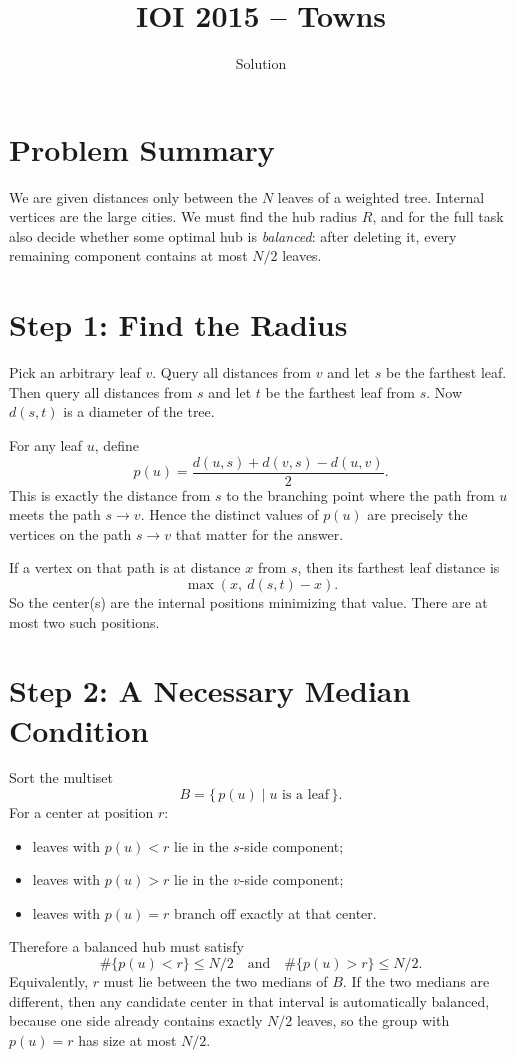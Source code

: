 \documentclass[11pt,a4paper]{article}
\title{IOI 2015 -- Towns}
\author{Solution}
\date{}
\begin{document}
\maketitle

\section{Problem Summary}
We are given distances only between the $N$ leaves of a weighted tree.
Internal vertices are the large cities.
We must find the hub radius $R$, and for the full task also decide whether some optimal hub is
\emph{balanced}: after deleting it, every remaining component contains at most $N/2$ leaves.

\section{Step 1: Find the Radius}
Pick an arbitrary leaf $v$.
Query all distances from $v$ and let $s$ be the farthest leaf.
Then query all distances from $s$ and let $t$ be the farthest leaf from $s$.
Now $d(s,t)$ is a diameter of the tree.

For any leaf $u$, define
\[
p(u) = \frac{d(u,s) + d(v,s) - d(u,v)}{2}.
\]
This is exactly the distance from $s$ to the branching point where the path from $u$ meets the
path $s \to v$.
Hence the distinct values of $p(u)$ are precisely the vertices on the path $s \to v$ that matter for
the answer.

If a vertex on that path is at distance $x$ from $s$, then its farthest leaf distance is
\[
\max(x,\ d(s,t)-x).
\]
So the center(s) are the internal positions minimizing that value.
There are at most two such positions.

\section{Step 2: A Necessary Median Condition}
Sort the multiset
\[
B = \{\,p(u)\mid u \text{ is a leaf}\,\}.
\]
For a center at position $r$:
\begin{itemize}
  \item leaves with $p(u) < r$ lie in the $s$-side component;
  \item leaves with $p(u) > r$ lie in the $v$-side component;
  \item leaves with $p(u) = r$ branch off exactly at that center.
\end{itemize}

Therefore a balanced hub must satisfy
\[
\#\{p(u) < r\} \le N/2
\quad\text{and}\quad
\#\{p(u) > r\} \le N/2.
\]
Equivalently, $r$ must lie between the two medians of $B$.
If the two medians are different, then any candidate center in that interval is automatically
balanced, because one side already contains exactly $N/2$ leaves, so the group with $p(u)=r$
has size at most $N/2$.
\end{document}
